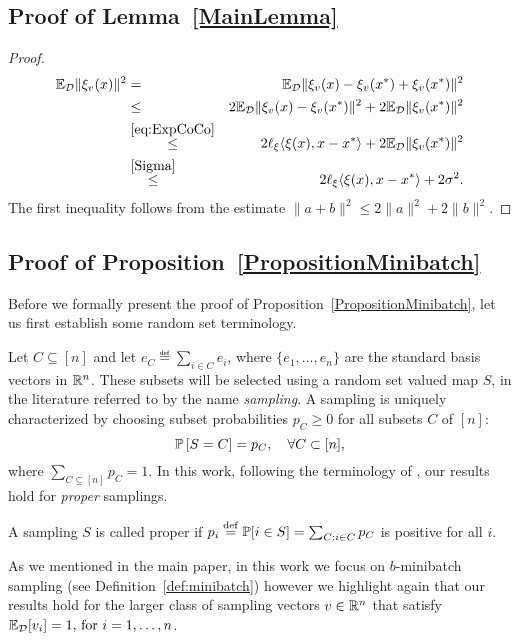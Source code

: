 \documentclass{article}
\begin{document}
\subsection{Proof of Lemma~\ref{MainLemma}}
\begin{proof}
\begin{eqnarray}
\label{oansxa}
\mathbb{E}_{{\cal D}} \|\xi_{v} (x)\|^2 &=& \mathbb{E}_{{\cal D}} \| \xi_v(x) - \xi_{v}(x^*) + \xi_{v}(x^*) \|^2 \notag\\ 
&\leq &2 \mathbb{E}_{{\cal D}} \| \xi_{v}(x) - \xi_{v}(x^*)\|^2 + 2  \mathbb{E}_{{\cal D}} \|\xi_{v}(x^*)\|^2 \notag\\ 
&\overset{\ref{eq:ExpCoCo}}{\leq}&2 \ell_{\xi}\langle \xi (x),x-x^*\rangle + 2 \mathbb{E}_{{\cal D}} \|\xi_{v}(x^*)\|^2\notag\\ 
&\overset{\eqref{Sigma}}{\leq} &2 \ell_{\xi}\langle \xi (x),x-x^*\rangle + 2 \sigma^2.
\end{eqnarray}
The first inequality follows from the estimate $\|a+b\|^2 \leq 2\|a\|^2 + 2\|b\|^2$.
\end{proof}

\subsection{Proof of Proposition~\ref{PropositionMinibatch}}
Before we formally present the proof of Proposition~\ref{PropositionMinibatch}, let us first establish some random set terminology. 

Let $C\subseteq [n]$ and let $e_C \eqdef \sum_{i\in C} e_i$, where $\{e_1,\dots,e_n\}$ are the standard basis vectors in $\mathbb{R}^n$.  These subsets will be selected using a random set valued map $S$, in the literature referred to by the name {\em sampling}.
A sampling is uniquely characterized by choosing subset probabilities $p_C\geq 0$ for all subsets $C$ of $[n]$:
\begin{equation}
\mathbb{P} \left[ S = C\right] = p_C,\quad \forall C \subset [n],
\end{equation}
where $\sum_{C\subseteq [n]} p_C =1$. In this work, following the terminology of \cite{gower2019sgd,gower2021sgd}, our results hold for \emph{proper} samplings. 
\begin{definition}\label{ProperSampling}A sampling $S$ is called proper if  $p_i \overset{\rm def}{=} \mathbb{P}[i\in S] = \sum_{C:i\in C}p_C$ is positive for all $i$. \end{definition}

As we mentioned in the main paper, in this work we focus on $b$-minibatch sampling (see Definition~\ref{def:minibatch}) however we highlight again that our results hold for the larger class of sampling vectors $v \in \mathbb{R}^n$ that satisfy $\mathbb{E}_{{\cal D}}[v_i]  = 1, \,\mbox{for }i=1,\ldots, n$.
\end{document}
